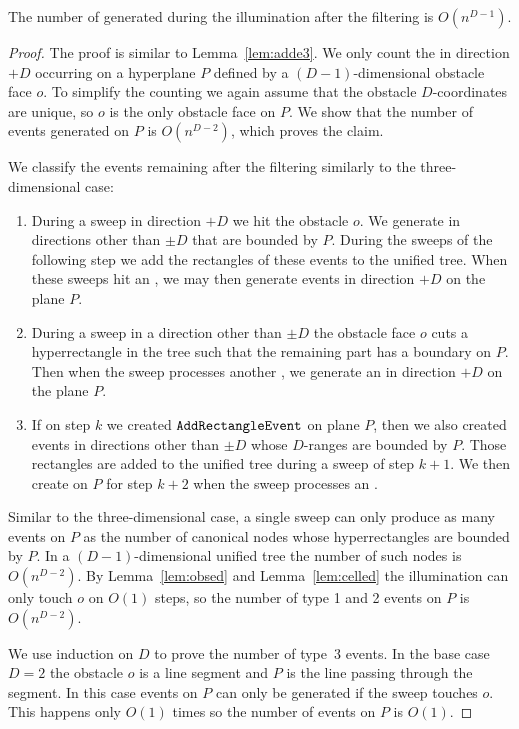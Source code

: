 \documentclass[english,gradu]{tktltiki2018}
\begin{document}
\begin{lem}\label{lem:added}The number of \addEs generated during the illumination after the filtering is $O(n^{D-1})$.\end{lem}
\begin{proof}
The proof is similar to Lemma~\ref{lem:adde3}.
We only count the \addEs in direction $+D$ occurring on a hyperplane $P$ defined by a $(D-1)$-dimensional obstacle face $o$.
To simplify the counting we again assume that the obstacle $D$-coordinates are unique, so $o$ is the only obstacle face on $P$.
We show that the number of events generated on $P$ is $O(n^{D-2})$, which proves the claim.

We classify the events remaining after the filtering similarly to the three-dimensional case:
\begin{enumerate}
\item During a sweep in direction $+D$ we hit the obstacle $o$.
	We generate \addEs in directions other than $\pm D$ that are bounded by $P$.
	During the sweeps of the following step we add the rectangles of these events to the unified tree.
	When these sweeps hit an \obsE, we may then generate events in direction $+D$ on the plane $P$.
\item During a sweep in a direction other than $\pm D$ the obstacle face $o$ cuts a hyperrectangle in the tree such that the remaining part has a boundary on $P$.
	Then when the sweep processes another \obsE, we generate an \addE in direction $+D$ on the plane $P$.
\item If on step $k$ we created $\mathtt{AddRectangleEvent}$ on plane $P$, then we also created events in directions other than $\pm D$ whose $D$-ranges are bounded by $P$.
	Those rectangles are added to the unified tree during a sweep of step $k+1$.
	We then create \addEs on $P$ for step $k+2$ when the sweep processes an \obsE.
\end{enumerate}

Similar to the three-dimensional case, a single sweep can only produce as many events on $P$ as the number of canonical nodes whose hyperrectangles are bounded by $P$.
In a $(D-1)$-dimensional unified tree the number of such nodes is $O(n^{D-2})$.
By Lemma~\ref{lem:obsed} and Lemma~\ref{lem:celled} the illumination can only touch $o$ on $O(1)$ steps, so the number of type 1 and 2 events on $P$ is $O(n^{D-2})$.

We use induction on $D$ to prove the number of type~3 events.
In the base case $D=2$ the obstacle $o$ is a line segment and $P$ is the line passing through the segment.
In this case events on $P$ can only be generated if the sweep touches $o$.
This happens only $O(1)$ times so the number of events on $P$ is $O(1)$.


\end{proof}
\end{document}
